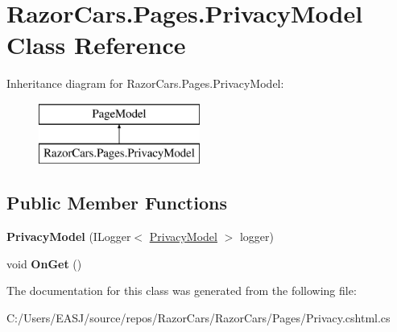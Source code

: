 \hypertarget{class_razor_cars_1_1_pages_1_1_privacy_model}{}\section{Razor\+Cars.\+Pages.\+Privacy\+Model Class Reference}
\label{class_razor_cars_1_1_pages_1_1_privacy_model}
Inheritance diagram for Razor\+Cars.\+Pages.\+Privacy\+Model\+:\begin{figure}[H]
\begin{center}
\leavevmode
\includegraphics[height=2.000000cm]{class_razor_cars_1_1_pages_1_1_privacy_model}
\end{center}
\end{figure}
\subsection*{Public Member Functions}
\begin{DoxyCompactItemize}
\item 
\mbox{\label{class_razor_cars_1_1_pages_1_1_privacy_model_af5f022f3b54361a66e24c871b0c1eeb2}} 
{\bfseries Privacy\+Model} (I\+Logger$<$ \mbox{\hyperlink{class_razor_cars_1_1_pages_1_1_privacy_model}{Privacy\+Model}} $>$ logger)
\item 
\mbox{\label{class_razor_cars_1_1_pages_1_1_privacy_model_a6444e96c6bf1777e623893c280e03938}} 
void {\bfseries On\+Get} ()
\end{DoxyCompactItemize}


The documentation for this class was generated from the following file\+:\begin{DoxyCompactItemize}
\item 
C\+:/\+Users/\+E\+A\+S\+J/source/repos/\+Razor\+Cars/\+Razor\+Cars/\+Pages/Privacy.\+cshtml.\+cs\end{DoxyCompactItemize}
